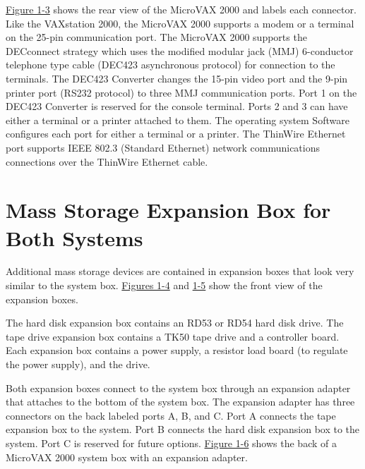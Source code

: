 \label{figure:1-2}

\newpage


\hyperref[figure:1-3]{Figure 1-3} shows the rear view of the MicroVAX 2000 and labels each 
connector. Like the VAXstation 2000, the MicroVAX 2000 supports a modem
or a terminal on the 25-pin communication port. The MicroVAX 2000 
supports the DECconnect strategy which uses the modified modular jack (MMJ)
6-conductor telephone type cable (DEC423 asynchronous protocol) for 
connection to the terminals. The DEC423 Converter changes the 15-pin video
port and the 9-pin printer port (RS232 protocol) to three MMJ communication 
ports. Port 1 on the DEC423 Converter is reserved for the console
terminal. Ports 2 and 3 can have either a terminal or a printer attached to
them. The operating system Software configures each port for either a terminal 
or a printer. The ThinWire Ethernet port supports IEEE 802.3 (Standard
Ethernet) network communications connections over the ThinWire Ethernet
cable.

\label{figure:1-3}

\section{Mass Storage Expansion Box for Both Systems}

Additional mass storage devices are contained in expansion boxes that look
very similar to the system box. \hyperref[figure:1-4]{Figures 1-4} and \hyperref[figure:1-5]{1-5} show the front view of
the expansion boxes.

The hard disk expansion box contains an RD53 or RD54 hard disk drive.
The tape drive expansion box contains a TK50 tape drive and a controller
board. Each expansion box contains a power supply, a resistor load board
(to regulate the power supply), and the drive.

\label{figure:1-4}

\newpage

\label{figure:1-5}

\newpage

Both expansion boxes connect to the system box through an expansion
adapter that attaches to the bottom of the system box. The expansion
adapter has three connectors on the back labeled ports A, B, and C. Port
A connects the tape expansion box to the system. Port B connects the hard
disk expansion box to the system. Port C is reserved for future options. 
\hyperref[figure:1-6]{Figure 1-6} shows the back of a MicroVAX 2000 system box with an expansion
adapter.

